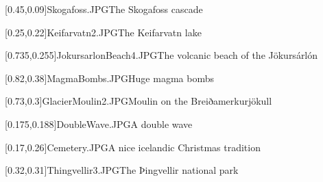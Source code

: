 



\graphicspath{{Figures/}{Figures/Iceland/}}


\subtitle{Day 3}
\date{09.10.2019}


    
    [0.45,0.09]{Skogafoss.JPG}{The Skogafoss cascade}
    
    [0.25,0.22]{Keifarvatn2.JPG}{The Keifarvatn lake}
    
    [0.735,0.255]{JokursarlonBeach4.JPG}{The volcanic beach of the J\"okurs\'arl\'on}
    
    [0.82,0.38]{MagmaBombs.JPG}{Huge magma bombs}
    
    [0.73,0.3]{GlacierMoulin2.JPG}{Moulin on the Breiðamerkurj\"okull}
    
    [0.175,0.188]{DoubleWave.JPG}{A double wave}
    
    
    
    [0.17,0.26]{Cemetery.JPG}{A nice icelandic Christmas tradition}
    
    [0.32,0.31]{Thingvellir3.JPG}{The Þingvellir national park}
    

